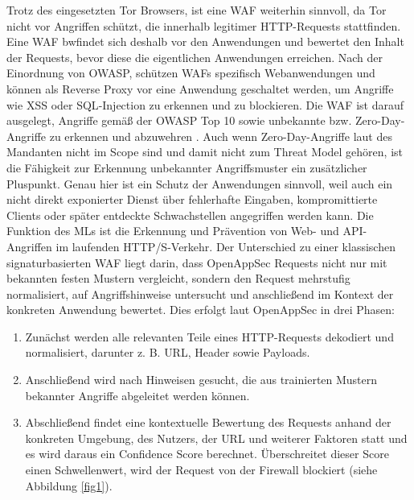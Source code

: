 Trotz des eingesetzten Tor Browsers, ist eine \ac{WAF} weiterhin sinnvoll, da Tor nicht vor Angriffen schützt, die innerhalb legitimer \acs{HTTP}-Requests stattfinden. Eine \ac{WAF} bwfindet sich deshalb vor den Anwendungen und bewertet den Inhalt der Requests, bevor diese die eigentlichen Anwendungen erreichen. Nach der Einordnung von \ac{OWASP}, schützen \acs{WAF}s spezifisch Webanwendungen und können als Reverse Proxy vor eine Anwendung geschaltet werden, um Angriffe wie \ac{XSS} oder \ac{SQL}-Injection zu erkennen und zu blockieren. \cite{owasp_waf} \newline \newline
Die \acs{WAF} ist darauf ausgelegt, Angriffe gemäß der \acs{OWASP} Top 10 sowie unbekannte bzw. Zero-Day-Angriffe zu erkennen und abzuwehren \cite{openappsec_security_practices}. Auch wenn Zero-Day-Angriffe laut des Mandanten nicht im Scope sind und damit nicht zum Threat Model gehören, ist die Fähigkeit zur Erkennung unbekannter Angriffsmuster ein zusätzlicher Pluspunkt. Genau hier ist ein Schutz der Anwendungen sinnvoll, weil auch ein nicht direkt exponierter Dienst über fehlerhafte Eingaben, kompromittierte Clients oder später entdeckte Schwachstellen angegriffen werden kann. \newline \newline
Die Funktion des \acl{ML}s ist die Erkennung und Prävention von Web- und \acs{API}-Angriffen im laufenden \acs{HTTP}/S-Verkehr. Der Unterschied zu einer klassischen signaturbasierten \ac{WAF} liegt darin, dass OpenAppSec Requests nicht nur mit bekannten festen Mustern vergleicht, sondern den Request mehrstufig normalisiert, auf Angriffshinweise untersucht und anschließend im Kontext der konkreten Anwendung bewertet. Dies erfolgt laut OpenAppSec in drei Phasen: 
\begin{enumerate}
    \item Zunächst werden alle relevanten Teile eines \acs{HTTP}-Requests dekodiert und normalisiert, darunter z. B. \ac{URL}, Header sowie Payloads.
    \item Anschließend wird nach Hinweisen gesucht, die aus trainierten Mustern bekannter Angriffe abgeleitet werden können.
    \item Abschließend findet eine kontextuelle Bewertung des Requests anhand der konkreten Umgebung, des Nutzers, der \acs{URL} und weiterer Faktoren statt und es wird daraus ein Confidence Score berechnet. Überschreitet dieser Score einen Schwellenwert, wird der Request von der Firewall blockiert (siehe Abbildung \ref{fig1}). \cite{openappsec_tech}
\end{enumerate}  

